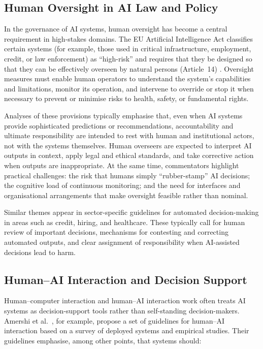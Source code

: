 \subsection{Human Oversight in AI Law and Policy}

In the governance of AI systems, human oversight has become a central requirement in high-stakes domains. The EU Artificial Intelligence Act classifies certain systems (for example, those used in critical infrastructure, employment, credit, or law enforcement) as ``high-risk'' and requires that they be designed so that they can be effectively overseen by natural persons (Article~14) \cite{EUAIAct2024}. Oversight measures must enable human operators to understand the system's capabilities and limitations, monitor its operation, and intervene to override or stop it when necessary to prevent or minimise risks to health, safety, or fundamental rights.

Analyses of these provisions typically emphasise that, even when AI systems provide sophisticated predictions or recommendations, accountability and ultimate responsibility are intended to rest with human and institutional actors, not with the systems themselves. Human overseers are expected to interpret AI outputs in context, apply legal and ethical standards, and take corrective action when outputs are inappropriate. At the same time, commentators highlight practical challenges: the risk that humans simply ``rubber-stamp'' AI decisions; the cognitive load of continuous monitoring; and the need for interfaces and organisational arrangements that make oversight feasible rather than nominal.

Similar themes appear in sector-specific guidelines for automated decision-making in areas such as credit, hiring, and healthcare. These typically call for human review of important decisions, mechanisms for contesting and correcting automated outputs, and clear assignment of responsibility when AI-assisted decisions lead to harm.

\subsection{Human--AI Interaction and Decision Support}

Human--computer interaction and human--AI interaction work often treats AI systems as decision-support tools rather than self-standing decision-makers. Amershi et al.\ \cite{Amershi2019}, for example, propose a set of guidelines for human--AI interaction based on a survey of deployed systems and empirical studies. Their guidelines emphasise, among other points, that systems should:

